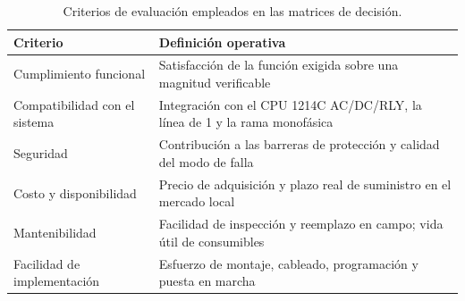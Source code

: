\begin{table}[H]
\centering
\caption{Criterios de evaluación empleados en las matrices de decisión.}
\label{tab:pugh-criterios}

\begin{tabularx}{\textwidth}{lX}
\toprule
\textbf{Criterio} & \textbf{Definición operativa} \\
\midrule

Cumplimiento funcional &
Satisfacción de la función exigida sobre una magnitud verificable \\

Compatibilidad con el sistema &
Integración con el CPU 1214C AC/DC/RLY, la línea de 1\textquotedbl{} y la rama monofásica \\

Seguridad &
Contribución a las barreras de protección y calidad del modo de falla \\

Costo y disponibilidad &
Precio de adquisición y plazo real de suministro en el mercado local \\

Mantenibilidad &
Facilidad de inspección y reemplazo en campo; vida útil de consumibles \\

Facilidad de implementación &
Esfuerzo de montaje, cableado, programación y puesta en marcha \\

\bottomrule
\end{tabularx}
\end{table}
